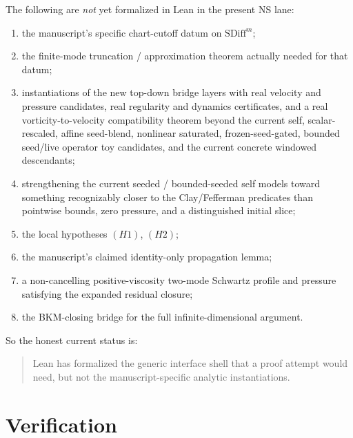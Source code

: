 \documentclass[11pt]{article}
\begin{document}
The following are \emph{not} yet formalized in Lean in the present NS lane:
\begin{enumerate}[leftmargin=1.5em]
  \item the manuscript's specific chart-cutoff datum on
  \(\mathrm{SDiff}^m\);
  \item the finite-mode truncation / approximation theorem actually needed for
  that datum;
  \item instantiations of the new top-down bridge layers with real velocity and
  pressure candidates, real regularity and dynamics certificates, and a real
  vorticity-to-velocity compatibility theorem beyond the current self,
  scalar-rescaled, affine seed-blend, nonlinear saturated, frozen-seed-gated,
  bounded seed/live operator toy candidates, and the current concrete windowed
  descendants;
  \item strengthening the current seeded / bounded-seeded self models toward
  something recognizably closer to the Clay/Fefferman predicates than pointwise
  bounds, zero pressure, and a distinguished initial slice;
  \item the local hypotheses \((H1)\), \((H2)\);
  \item the manuscript's claimed identity-only propagation lemma;
  \item a non-cancelling positive-viscosity two-mode Schwartz profile and
  pressure satisfying the expanded residual closure;
  \item the BKM-closing bridge for the full infinite-dimensional argument.
\end{enumerate}

So the honest current status is:
\begin{quote}
Lean has formalized the generic interface shell that a proof attempt would need,
but not the manuscript-specific analytic instantiations.
\end{quote}

\section{Verification}\label{sec:ns-verification}
\end{document}
